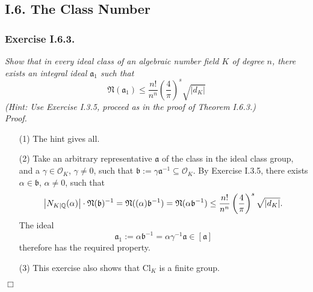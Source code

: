 \documentclass{article}
\begin{document}



\subsection*{I.6. The Class Number \\}



\subsubsection*{Exercise I.6.3.}
\emph{Show that in every ideal class of an algebraic number field $K$ of degree $n$,
there exists an integral ideal $\mathfrak{a}_1$ such that
\[
  \mathfrak{N}(\mathfrak{a}_1)
  \leq
  \frac{n!}{n^n}\left( \frac{4}{\pi} \right)^s \sqrt{|d_K|}
\]
(Hint: Use Exercise I.3.5, proceed as in the proof of Theorem I.6.3.)} \\



\emph{Proof.}
\begin{enumerate}
\item[(1)]
  The hint gives all.

\item[(2)]
  Take an arbitrary representative $\mathfrak{a}$ of the class in the ideal class group,
  and a $\gamma \in \mathcal{O}_K$, $\gamma \neq 0$,
  such that $\mathfrak{b} := \gamma \mathfrak{a}^{-1} \subseteq \mathcal{O}_K$.
  By Exercise I.3.5, there exists $\alpha \in \mathfrak{b}$, $\alpha \neq 0$,
  such that
  \[
    \abs{ N_{K|\mathbb{Q}}(\alpha) } \cdot \mathfrak{N}(\mathfrak{b})^{-1}
    = \mathfrak{N}((\alpha) \mathfrak{b}^{-1})
    = \mathfrak{N}(\alpha \mathfrak{b}^{-1})
    \leq \frac{n!}{n^n} \left( \frac{4}{\pi} \right)^{s} \sqrt{|d_K|}.
  \]
  The ideal
  \[
    \mathfrak{a}_1
    := \alpha \mathfrak{b}^{-1}
    = \alpha \gamma^{-1} \mathfrak{a}
    \in [\mathfrak{a}]
  \]
  therefore has the required property.

\item[(3)]
  This exercise also shows that $\mathrm{Cl}_K$ is a finite group.
\end{enumerate}
$\Box$ \\\\
\end{document}
